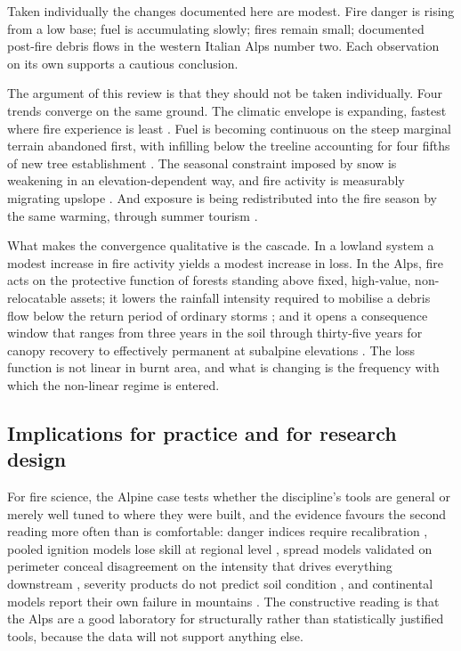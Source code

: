 \documentclass[11pt,a4paper]{article}
\begin{document}
Taken individually the changes documented here are modest. Fire danger is rising from a low base; fuel is accumulating slowly; fires remain small; documented post-fire debris flows in the western Italian Alps number two. Each observation on its own supports a cautious conclusion.

The argument of this review is that they should not be taken individually. Four trends converge on the same ground. The climatic envelope is expanding, fastest where fire experience is least \citep{gerberding_mapping_2025, miller_climate_2024}. Fuel is becoming continuous on the steep marginal terrain abandoned first, with infilling below the treeline accounting for four fifths of new tree establishment \citep{frei_evidence_2023, garbarino_contrasting_2020, conedera_linking_2024}. The seasonal constraint imposed by snow is weakening in an elevation-dependent way, and fire activity is measurably migrating upslope \citep{rangwala_climate_2012, beloiu_climatedriven_2026}. And exposure is being redistributed into the fire season by the same warming, through summer tourism \citep{pede_mountain_2022}.

What makes the convergence qualitative is the cascade. In a lowland system a modest increase in fire activity yields a modest increase in loss. In the Alps, fire acts on the protective function of forests standing above fixed, high-value, non-relocatable assets; it lowers the rainfall intensity required to mobilise a debris flow below the return period of ordinary storms \citep{laporta_postwildfire_2025}; and it opens a consequence window that ranges from three years in the soil \citep{negri_wildfire_2026} through thirty-five years for canopy recovery \citep{stritih_alternative_2023} to effectively permanent at subalpine elevations \citep{degiuli_arrested_2024}. The loss function is not linear in burnt area, and what is changing is the frequency with which the non-linear regime is entered.

\subsection{Implications for practice and for research design}

For fire science, the Alpine case tests whether the discipline's tools are general or merely well tuned to where they were built, and the evidence favours the second reading more often than is comfortable: danger indices require recalibration \citep{de_angelis_modelling_2015, zacharakis_environmental_2023}, pooled ignition models lose skill at regional level \citep{gelabert_assessing_2025}, spread models validated on perimeter conceal disagreement on the intensity that drives everything downstream \citep{malanchini_modeling_2025}, severity products do not predict soil condition \citep{negri_wildfire_2026}, and continental models report their own failure in mountains \citep{forrest_understanding_2024}. The constructive reading is that the Alps are a good laboratory for structurally rather than statistically justified tools, because the data will not support anything else.
\end{document}
